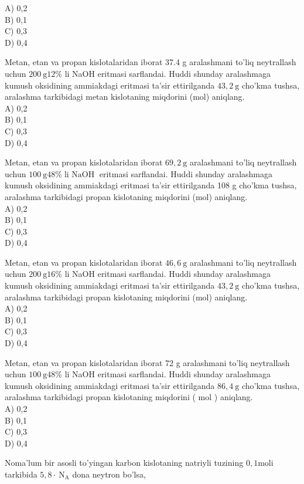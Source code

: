A) 0,2\\
B) 0,1\\
C) 0,3\\
D) 0,4
  \item Metan, etan va propan kislotalaridan iborat 37.4 g aralashmani to'liq neytrallash uchun $200 \mathrm{~g} 12 \%$ li NaOH eritmasi sarflandai. Huddi shunday aralashmaga kumush oksidining ammiakdagi eritmasi ta'sir ettirilganda $43,2 \mathrm{~g}$ cho'kma tushsa, aralashma tarkibidagi metan kislotaning miqdorini (mol) aniqlang.\\
A) 0,2\\
B) 0,1\\
C) 0,3\\
D) 0,4
  \item Metan, etan va propan kislotalaridan iborat $69,2 \mathrm{~g}$ aralashmani to'liq neytrallash uchun $100 \mathrm{~g} 48 \% \operatorname{li~NaOH}$ eritmasi sarflandai. Huddi shunday aralashmaga kumush oksidining ammiakdagi eritmasi ta'sir ettirilganda 108 g cho'kma tushsa, aralashma tarkibidagi propan kislotaning miqdorini (mol) aniqlang.\\
A) 0,2\\
B) 0,1\\
C) 0,3\\
D) 0,4
  \item Metan, etan va propan kislotalaridan iborat $46,6 \mathrm{~g}$ aralashmani to'liq neytrallash uchun $200 \mathrm{~g} 16 \%$ li NaOH eritmasi sarflandai. Huddi shunday aralashmaga kumush oksidining ammiakdagi eritmasi ta'sir ettirilganda $43,2 \mathrm{~g}$ cho'kma tushsa, aralashma tarkibidagi propan kislotaning miqdorini (mol) aniqlang.\\
A) 0,2\\
B) 0,1\\
C) 0,3\\
D) 0,4
  \item Metan, etan va propan kislotalaridan iborat 72 g aralashmani to'liq neytrallash uchun $100 \mathrm{~g} 48 \%$ li NaOH eritmasi sarflandai. Huddi shunday aralashmaga kumush oksidining ammiakdagi eritmasi ta'sir ettirilganda $86,4 \mathrm{~g}$ cho'kma tushsa, aralashma tarkibidagi propan kislotaning miqdorini ( mol ) aniqlang.\\
A) 0,2\\
B) 0,1\\
C) 0,3\\
D) 0,4
  \item Noma'lum bir asosli to'yingan karbon kislotaning natriyli tuzining $0,1 \mathrm{moli}$ tarkibida $5,8 \cdot \mathrm{~N}_{\mathrm{A}}$ dona neytron bo'lsa,\\
